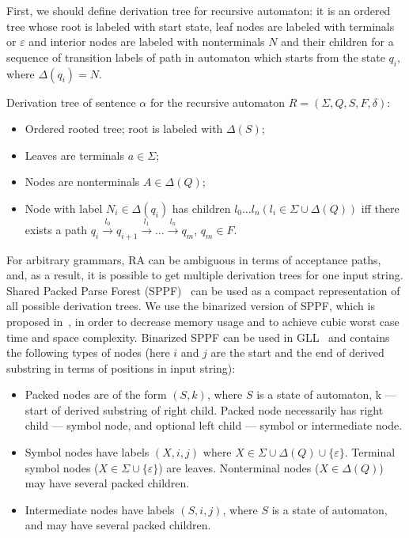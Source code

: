 \documentclass[runningheads,a4paper]{llncs}
\begin{document}
First, we should define derivation tree for recursive automaton: it is an ordered tree whose root is labeled with start state,
leaf nodes are labeled with terminals or $\varepsilon$ and interior nodes are labeled with 
nonterminals $N$ and their children for a sequence of transition labels of path in 
automaton which starts from the state $q_i$, where $ \Delta(q_i) = N $.

\begin{mydef}

Derivation tree of sentence $\alpha$ for the recursive automaton $R=(\Sigma, Q, S, F, \delta)$:%

\begin{itemize}
\item Ordered rooted tree; root is labeled with $\Delta(S)$;
\item Leaves are terminals $a\in \Sigma$;
\item Nodes are nonterminals $A\in \Delta(Q)$;
\item Node with label $N_i \in \Delta(q_i)$ has children $l_0 \dots l_n (l_i \in \Sigma \cup \Delta(Q))$ iff there exists a
path $q_i \xrightarrow[]{l_0} q_{i+1} \xrightarrow[]{l_1} \dots \xrightarrow{l_n} q_m$, $q_m \in F$. 
\end{itemize}

\end{mydef}

For arbitrary grammars, RA can be ambiguous in terms of acceptance paths, and, as a result, it is possible to get multiple derivation trees for one input string.
Shared Packed Parse Forest (SPPF)~\cite{SPPF} can be used as a compact representation of all possible derivation trees.
We use the binarized version of SPPF, which is proposed in~\cite{brnglr}, in order to decrease memory usage and to achieve cubic worst case time and space complexity.
Binarized SPPF can be used in GLL~\cite{scott2013gll} and contains the following types of nodes (here $i$ and $j$ are the start and the end of derived substring in terms of positions in input string):

\begin{itemize}
\item Packed nodes are of the form $(S, k)$, where $S$ is a state of automaton, k --- start of derived substring of right child.
Packed node necessarily has right child --- symbol node, and optional left child --- symbol or intermediate node.
\item Symbol nodes have labels $(X, i, j)$ where $X \in \Sigma \cup \Delta(Q) \cup \{\varepsilon\}$.
Terminal symbol nodes ($X \in \Sigma \cup \{\varepsilon\}$) are leaves. 
Nonterminal nodes ($X \in \Delta(Q)$) may have several packed children. 
\item Intermediate nodes have labels $ (S, i, j) $, where $S$ is a state of automaton, and may have several packed children. 
\end{itemize}
\end{document}
